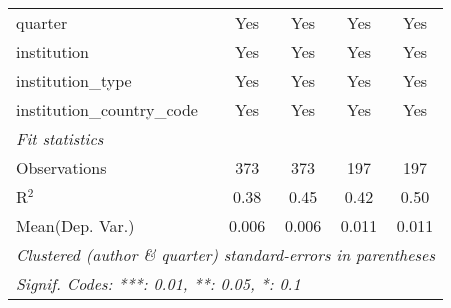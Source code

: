 \begin{tabular}{lcccc}
   quarter                                  & Yes     & Yes     & Yes     & Yes\\  
   institution                              & Yes     & Yes     & Yes     & Yes\\  
   institution\_type                        & Yes     & Yes     & Yes     & Yes\\  
   institution\_country\_code               & Yes     & Yes     & Yes     & Yes\\  
   \midrule
   \emph{Fit statistics}\\
   Observations                             & 373     & 373     & 197     & 197\\  
   R$^2$                                    & 0.38    & 0.45    & 0.42    & 0.50\\  
Mean(Dep. Var.) & 0.006 & 0.006 & 0.011 & 0.011 \\
   \midrule \midrule
   \multicolumn{5}{l}{\emph{Clustered (author \& quarter) standard-errors in parentheses}}\\
   \multicolumn{5}{l}{\emph{Signif. Codes: ***: 0.01, **: 0.05, *: 0.1}}\\
\end{tabular}
\par\endgroup
